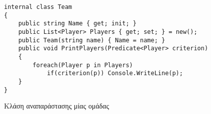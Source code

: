 \begin{listing}[htbp]
\begin{verbatim}
internal class Team
{
    public string Name { get; init; }
    public List<Player> Players { get; set; } = new();
    public Team(string name) { Name = name; }
    public void PrintPlayers(Predicate<Player> criterion)
    {
        foreach(Player p in Players)
            if(criterion(p)) Console.WriteLine(p);
    }
}
\end{verbatim}
\caption{Κλάση αναπαράστασης μίας ομάδας}
\label{delegTeam}
\end{listing}